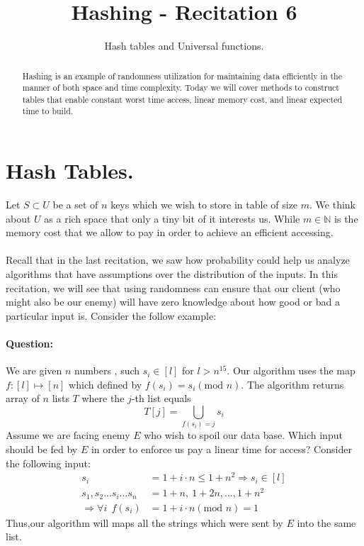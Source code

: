 \title{Hashing - Recitation 6} 
\author{Hash tables and Universal functions.}


\begin{abstract}
     Hashing is an example of randomness utilization for maintaining data efficiently in the manner of both space and time complexity. Today we will cover methods to construct tables that enable constant worst time access, linear memory cost, and linear expected time to build.   
\end{abstract}

\section{Hash Tables.}
Let \( S \subset U \) be a set of \(n\) keys which we wish to store in table of size \(m\). We think about \(U\) as a rich space that only a tiny bit of it interests us. While \( m \in \mathbb{N}\) is the memory cost that we allow to pay in order to achieve an efficient accessing.   

\paragraph{} Recall that in the last recitation, we saw how probability could help us analyze algorithms that have assumptions over the distribution of the inputs. In this recitation, we will see that using randomness can ensure that our client (who might also be our enemy) will have zero knowledge about how good or bad a particular input is. Consider the follow example:     

\paragraph{Question:} We are given \(n\) numbers , such \( s_i \in \left[l\right]\) for \( l > n^{15} \). Our algorithm uses the map \(f : \left[l\right] \mapsto [n] \) which defined by \(f\left(s_{i}\right) = s_{i} \left(\text{mod } n\right)\).
The algorithm returns array of \(n\) lists \(T\) where the \(j\)-th list equals \begin{equation*}
T\left[j\right] = \bigcup_{f\left(s_i\right)=j}{s_i}\end{equation*} 
Assume we are facing enemy \( E \) who wish to spoil our data base. Which input should be fed by \(E\) in order to enforce us pay a linear time for access?
Consider the following input: \begin{equation*}
\begin{split}
    s_{i} &= 1 + i\cdot n \le 1 + n^2 \Rightarrow s_{i} \in \left[l\right] \\ 
    s_1,s_2 ... s_i ... s_n & = 1 + n, \ 1 + 2n, ..., 1 + n^2 \\ 
    \Rightarrow \forall i \ \  f\left(s_i\right) &  = 1 + i\cdot n    \left(\text{mod } n\right) = 1 
\end{split}
\end{equation*}
Thus,our algorithm will maps all the strings which were sent by \(E\) into the same list.

